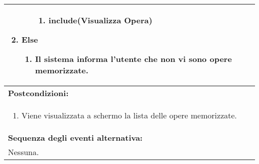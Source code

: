 \begin{table}[H]
\begin{tabular}{|p{\linewidth}|}
\begin{enumerate}
\begin{enumerate}
\begin{enumerate}
                    \item \textbf{include}(Visualizza Opera)
                \end{enumerate}
            \end{enumerate}
            \item \textbf{Else}
            \begin{enumerate}
                \item Il sistema informa l'utente che non vi sono opere memorizzate.
            \end{enumerate}
        \end{enumerate} \\
        \hline
        \cellcolor{gray!20}
        \textbf{Postcondizioni:} \\
        \cellcolor{gray!20}
        \begin{minipage}{\linewidth}
            \begin{enumerate}
                \item Viene visualizzata a schermo la lista delle opere memorizzate.
            \end{enumerate}
        \end{minipage} \\
        \hline
        \textbf{Sequenza degli eventi alternativa:} \\
        Nessuna. \\
        \hline
    \end{tabular}
\end{table}